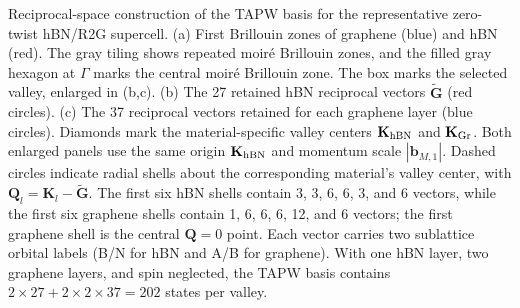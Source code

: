 Reciprocal-space construction of the TAPW basis for the representative
zero-twist hBN/R2G supercell. (a) First Brillouin zones of graphene (blue) and hBN
(red). The gray tiling shows repeated moir\'e Brillouin zones, and the filled gray
hexagon at $\Gamma$ marks the central moir\'e Brillouin zone. The box marks the
selected valley, enlarged in (b,c). (b) The 27 retained hBN reciprocal vectors
$\widetilde{\mathbf G}$ (red circles). (c) The 37 reciprocal vectors retained for
each graphene layer (blue circles). Diamonds mark the material-specific valley
centers $\mathbf K_{\rm hBN}$ and $\mathbf K_{\rm Gr}$. Both enlarged panels use
the same origin $\mathbf K_{\rm hBN}$ and momentum scale $|\mathbf b_{M,1}|$.
Dashed circles indicate radial shells about the corresponding material's valley
center, with $\mathbf Q_l=\mathbf K_l-\widetilde{\mathbf G}$. The first six hBN
shells contain 3, 3, 6, 6, 3, and 6 vectors, while the first six graphene shells
contain 1, 6, 6, 6, 12, and 6 vectors; the first graphene shell is the central
$\mathbf Q=0$ point. Each vector carries two sublattice orbital labels (B/N for
hBN and A/B for graphene). With one hBN layer, two graphene layers, and spin
neglected, the TAPW basis contains $2\times27+2\times2\times37=202$ states per valley.
